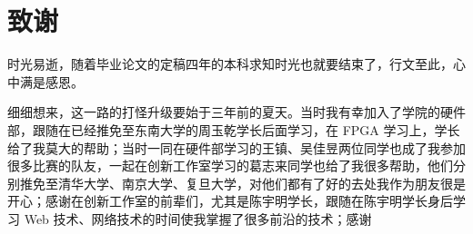 \chapter[致谢]{致\quad 谢}%
\thispagestyle{noheaderstyle}%

时光易逝，随着毕业论文的定稿四年的本科求知时光也就要结束了，行文至此，心中满是感恩。

细细想来，这一路的打怪升级要始于三年前的夏天。当时我有幸加入了学院的硬件部，跟随在已经推免至东南大学的周玉乾学长后面学习，在 FPGA 学习上，学长给了我莫大的帮助；当时一同在硬件部学习的王镇、吴佳昱两位同学也成了我参加很多比赛的队友，一起在创新工作室学习的葛志来同学也给了我很多帮助，他们分别推免至清华大学、南京大学、复旦大学，对他们都有了好的去处我作为朋友很是开心；感谢在创新工作室的前辈们，尤其是陈宇明学长，跟随在陈宇明学长身后学习 Web 技术、网络技术的时间使我掌握了很多前沿的技术；感谢


\cleardoublepage[plain]%
